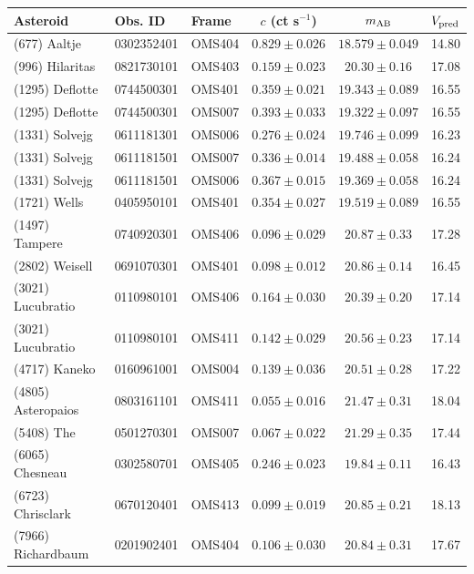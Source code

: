 \begin{table}[t]
\centering
\small
\setlength{\tabcolsep}{3pt}
\renewcommand{\arraystretch}{1.03}
\begin{tabular}{lllccc}
\toprule
Asteroid & Obs. ID & Frame & $c$ (ct s$^{-1}$) & $m_{\rm AB}$ & $V_{\rm pred}$ \\
\midrule
(677) Aaltje & 0302352401 & OMS404 & $0.829 \pm 0.026$ & $18.579 \pm 0.049$ & 14.80 \\
(996) Hilaritas & 0821730101 & OMS403 & $0.159 \pm 0.023$ & $20.30 \pm 0.16$ & 17.08 \\
(1295) Deflotte & 0744500301 & OMS401 & $0.359 \pm 0.021$ & $19.343 \pm 0.089$ & 16.55 \\
(1295) Deflotte & 0744500301 & OMS007 & $0.393 \pm 0.033$ & $19.322 \pm 0.097$ & 16.55 \\
(1331) Solvejg & 0611181301 & OMS006 & $0.276 \pm 0.024$ & $19.746 \pm 0.099$ & 16.23 \\
(1331) Solvejg & 0611181501 & OMS007 & $0.336 \pm 0.014$ & $19.488 \pm 0.058$ & 16.24 \\
(1331) Solvejg & 0611181501 & OMS006 & $0.367 \pm 0.015$ & $19.369 \pm 0.058$ & 16.24 \\
(1721) Wells & 0405950101 & OMS401 & $0.354 \pm 0.027$ & $19.519 \pm 0.089$ & 16.55 \\
(1497) Tampere & 0740920301 & OMS406 & $0.096 \pm 0.029$ & $20.87 \pm 0.33$ & 17.28 \\
(2802) Weisell & 0691070301 & OMS401 & $0.098 \pm 0.012$ & $20.86 \pm 0.14$ & 16.45 \\
(3021) Lucubratio & 0110980101 & OMS406 & $0.164 \pm 0.030$ & $20.39 \pm 0.20$ & 17.14 \\
(3021) Lucubratio & 0110980101 & OMS411 & $0.142 \pm 0.029$ & $20.56 \pm 0.23$ & 17.14 \\
(4717) Kaneko & 0160961001 & OMS004 & $0.139 \pm 0.036$ & $20.51 \pm 0.28$ & 17.22 \\
(4805) Asteropaios & 0803161101 & OMS411 & $0.055 \pm 0.016$ & $21.47 \pm 0.31$ & 18.04 \\
(5408) The & 0501270301 & OMS007 & $0.067 \pm 0.022$ & $21.29 \pm 0.35$ & 17.44 \\
(6065) Chesneau & 0302580701 & OMS405 & $0.246 \pm 0.023$ & $19.84 \pm 0.11$ & 16.43 \\
(6723) Chrisclark & 0670120401 & OMS413 & $0.099 \pm 0.019$ & $20.85 \pm 0.21$ & 18.13 \\
(7966) Richardbaum & 0201902401 & OMS404 & $0.106 \pm 0.030$ & $20.84 \pm 0.31$ & 17.67 \\

\end{tabular}
\end{table}
